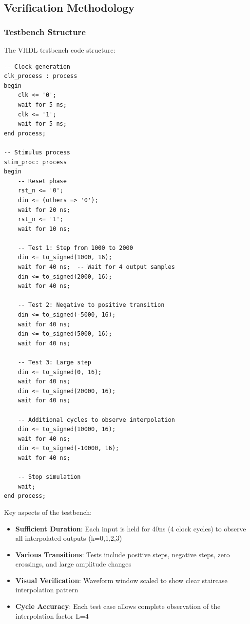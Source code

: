 \documentclass[a4paper,11pt]{article}
\begin{document}
\subsection{Verification Methodology}

\subsubsection{Testbench Structure}




The VHDL testbench code structure:

\begin{lstlisting}
-- Clock generation
clk_process : process
begin
    clk <= '0';
    wait for 5 ns;
    clk <= '1';
    wait for 5 ns;
end process;

-- Stimulus process
stim_proc: process
begin
    -- Reset phase
    rst_n <= '0';
    din <= (others => '0');
    wait for 20 ns;
    rst_n <= '1';
    wait for 10 ns;
    
    -- Test 1: Step from 1000 to 2000
    din <= to_signed(1000, 16);
    wait for 40 ns;  -- Wait for 4 output samples
    din <= to_signed(2000, 16);
    wait for 40 ns;
    
    -- Test 2: Negative to positive transition
    din <= to_signed(-5000, 16);
    wait for 40 ns;
    din <= to_signed(5000, 16);
    wait for 40 ns;
    
    -- Test 3: Large step
    din <= to_signed(0, 16);
    wait for 40 ns;
    din <= to_signed(20000, 16);
    wait for 40 ns;
    
    -- Additional cycles to observe interpolation
    din <= to_signed(10000, 16);
    wait for 40 ns;
    din <= to_signed(-10000, 16);
    wait for 40 ns;
    
    -- Stop simulation
    wait;
end process;
\end{lstlisting}

Key aspects of the testbench:
\begin{itemize}
    \item \textbf{Sufficient Duration}: Each input is held for 40ns (4 clock cycles) to observe all interpolated outputs (k=0,1,2,3)
    \item \textbf{Various Transitions}: Tests include positive steps, negative steps, zero crossings, and large amplitude changes
    \item \textbf{Visual Verification}: Waveform window scaled to show clear staircase interpolation pattern
    \item \textbf{Cycle Accuracy}: Each test case allows complete observation of the interpolation factor L=4
\end{itemize}
\end{document}
